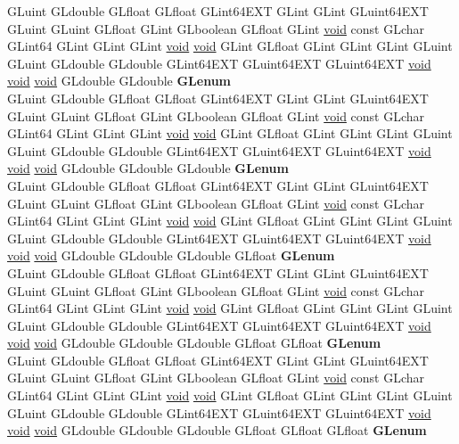 \begin{DoxyCompactItemize}
\begin{tabbing}
\>GLuint GLdouble GLfloat GLfloat GLint64EXT GLint GLint GLuint64EXT GLuint GLuint GLfloat GLint GLboolean GLfloat GLint \hyperlink{interfacevoid}{void} const GLchar GLint64 GLint GLint GLint \hyperlink{interfacevoid}{void} \hyperlink{interfacevoid}{void} GLint GLfloat GLint GLint GLint GLuint GLuint GLdouble GLdouble GLint64EXT GLuint64EXT GLuint64EXT \hyperlink{interfacevoid}{void} \hyperlink{interfacevoid}{void} \hyperlink{interfacevoid}{void} GLdouble GLdouble {\bfseries GLenum}\\
\>GLuint GLdouble GLfloat GLfloat GLint64EXT GLint GLint GLuint64EXT GLuint GLuint GLfloat GLint GLboolean GLfloat GLint \hyperlink{interfacevoid}{void} const GLchar GLint64 GLint GLint GLint \hyperlink{interfacevoid}{void} \hyperlink{interfacevoid}{void} GLint GLfloat GLint GLint GLint GLuint GLuint GLdouble GLdouble GLint64EXT GLuint64EXT GLuint64EXT \hyperlink{interfacevoid}{void} \hyperlink{interfacevoid}{void} \hyperlink{interfacevoid}{void} GLdouble GLdouble GLdouble {\bfseries GLenum}\\
\>GLuint GLdouble GLfloat GLfloat GLint64EXT GLint GLint GLuint64EXT GLuint GLuint GLfloat GLint GLboolean GLfloat GLint \hyperlink{interfacevoid}{void} const GLchar GLint64 GLint GLint GLint \hyperlink{interfacevoid}{void} \hyperlink{interfacevoid}{void} GLint GLfloat GLint GLint GLint GLuint GLuint GLdouble GLdouble GLint64EXT GLuint64EXT GLuint64EXT \hyperlink{interfacevoid}{void} \hyperlink{interfacevoid}{void} \hyperlink{interfacevoid}{void} GLdouble GLdouble GLdouble GLfloat {\bfseries GLenum}\\
\>GLuint GLdouble GLfloat GLfloat GLint64EXT GLint GLint GLuint64EXT GLuint GLuint GLfloat GLint GLboolean GLfloat GLint \hyperlink{interfacevoid}{void} const GLchar GLint64 GLint GLint GLint \hyperlink{interfacevoid}{void} \hyperlink{interfacevoid}{void} GLint GLfloat GLint GLint GLint GLuint GLuint GLdouble GLdouble GLint64EXT GLuint64EXT GLuint64EXT \hyperlink{interfacevoid}{void} \hyperlink{interfacevoid}{void} \hyperlink{interfacevoid}{void} GLdouble GLdouble GLdouble GLfloat GLfloat {\bfseries GLenum}\\
\>GLuint GLdouble GLfloat GLfloat GLint64EXT GLint GLint GLuint64EXT GLuint GLuint GLfloat GLint GLboolean GLfloat GLint \hyperlink{interfacevoid}{void} const GLchar GLint64 GLint GLint GLint \hyperlink{interfacevoid}{void} \hyperlink{interfacevoid}{void} GLint GLfloat GLint GLint GLint GLuint GLuint GLdouble GLdouble GLint64EXT GLuint64EXT GLuint64EXT \hyperlink{interfacevoid}{void} \hyperlink{interfacevoid}{void} \hyperlink{interfacevoid}{void} GLdouble GLdouble GLdouble GLfloat GLfloat GLfloat {\bfseries GLenum}\\

\end{tabbing}
\end{DoxyCompactItemize}
